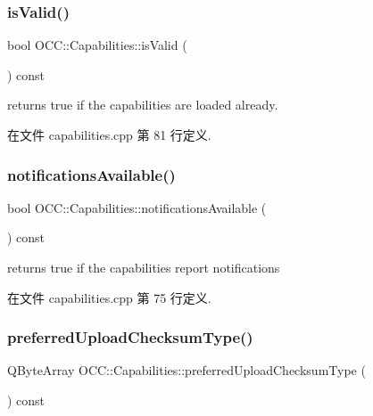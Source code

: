 \subsubsection{\texorpdfstring{is\+Valid()}{isValid()}}
{\footnotesize\ttfamily bool O\+C\+C\+::\+Capabilities\+::is\+Valid (\begin{DoxyParamCaption}{ }\end{DoxyParamCaption}) const}



returns true if the capabilities are loaded already. 



在文件 capabilities.\+cpp 第 81 行定义.

\mbox{\label{class_o_c_c_1_1_capabilities_aadcf59b4ebcac111c38c170b8228af22}} 
\subsubsection{\texorpdfstring{notifications\+Available()}{notificationsAvailable()}}
{\footnotesize\ttfamily bool O\+C\+C\+::\+Capabilities\+::notifications\+Available (\begin{DoxyParamCaption}{ }\end{DoxyParamCaption}) const}



returns true if the capabilities report notifications 



在文件 capabilities.\+cpp 第 75 行定义.

\mbox{\label{class_o_c_c_1_1_capabilities_a1472ad6e939b125731068ca8bdd99176}} 
\subsubsection{\texorpdfstring{preferred\+Upload\+Checksum\+Type()}{preferredUploadChecksumType()}}
{\footnotesize\ttfamily Q\+Byte\+Array O\+C\+C\+::\+Capabilities\+::preferred\+Upload\+Checksum\+Type (\begin{DoxyParamCaption}{ }\end{DoxyParamCaption}) const}

